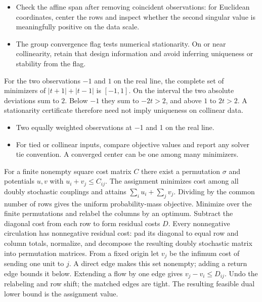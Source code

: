 \expandafter\def\csname statadic@diagnostics@STATADIC-MEDIAN-004\endcsname{\begin{itemize}
\item Check the affine span after removing coincident observations: for Euclidean coordinates, center the rows and inspect whether the second singular value is meaningfully positive on the data scale.
\item The group convergence flag tests numerical stationarity. On or near collinearity, retain that design information and avoid inferring uniqueness or stability from the flag.
\end{itemize}}
\expandafter\def\csname statadic@statement@STATADIC-MEDIAN-005\endcsname{For the two observations $-1$ and $1$ on the real line,
  the complete set of minimizers of $|t+1|+|t-1|$ is $[-1,1]$.}
\expandafter\def\csname statadic@proof@STATADIC-MEDIAN-005\endcsname{On the interval the two absolute deviations sum to $2$.
  Below $-1$ they sum to $-2t>2$, and above $1$ to $2t>2$.
  A stationarity certificate therefore need not imply uniqueness on collinear data.}
\expandafter\def\csname statadic@assumptions@STATADIC-MEDIAN-005\endcsname{\begin{itemize}
\item Two equally weighted observations at \ensuremath{-}1 and 1 on the real line.
\end{itemize}}
\expandafter\def\csname statadic@diagnostics@STATADIC-MEDIAN-005\endcsname{\begin{itemize}
\item For tied or collinear inputs, compare objective values and report any solver tie convention. A converged center can be one among many minimizers.
\end{itemize}}
\expandafter\def\csname statadic@statement@STATADIC-TRANSPORT-002\endcsname{For a finite nonempty square cost matrix $C$ there exist a permutation
  $\sigma$ and potentials $u,v$ with $u_i+v_j\le C_{ij}$. The assignment minimizes cost
  among all doubly stochastic couplings and attains $\sum_i u_i+\sum_j v_j$.
  Dividing by the common number of rows gives the uniform probability-mass objective.}
\expandafter\def\csname statadic@proof@STATADIC-TRANSPORT-002\endcsname{Minimize over the finite permutations and relabel the columns by an
  optimum. Subtract the diagonal cost from each row to form residual costs $D$.
  Every nonnegative circulation has nonnegative residual cost: pad its diagonal to
  equal row and column totals, normalize, and decompose the resulting doubly stochastic
  matrix into permutation matrices. From a fixed origin let $v_j$ be the infimum
  cost of sending one unit to $j$. A direct edge makes this set nonempty; adding
  a return edge bounds it below. Extending a flow by one edge gives
  $v_j-v_i\le D_{ij}$. Undo the relabeling and row shift; the matched edges are tight.
  The resulting feasible dual lower bound is the assignment value.}
